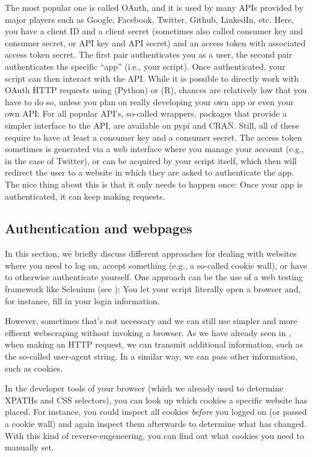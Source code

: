The most popular one is called OAuth, and it is used by many APIs
provided by major players such as Google, Facebook, Twitter, Github,
LinkedIn, etc. Here, you have a client ID and a client secret
(sometimes also called consumer key and consumer secret, or API key and API secret) and an
access token with associated access token secret. The first pair
authenticates you as a user, the second pair authenticates the
specific ``app'' (i.e., your script). Once authenticated, your
script can then interact with the API. While it is possible to
directly work with OAuth HTTP requests using 
(Python) or  (R), chances are relatively low that you
have to do so, unless you plan on really developing your own app
or even your own API: For all popular API's, so-called wrappers,
packages that provide a simpler interface to the API, are available
on pypi and CRAN. Still, all of these require to have at least
a consumer key and a consumer secret. The access token sometimes
is generated via a web interface where you manage your account
(e.g., in the case of Twitter), or can be acquired by your script
itself, which then will redirect the user to a website in which
they are asked to authenticate the app. The nice thing about this
is that it only needs to happen once: Once your app is authenticated,
it can keep making requests.




\subsection{Authentication and webpages}
\label{sec:authweb}
In this section, we briefly discuss different approaches for dealing
with websites where you need to log on, accept something (e.g., a
so-called cookie wall), or have to otherwise authenticate yourself.
One approach can be the use of a web testing framework like Selenium
(see ): You let your script literally open a browser
and, for instance, fill in your login information.

However, sometimes that's not necessary and we can still use simpler
and more efficent webscraping without invoking a browser. As we have already
seen in , when making an HTTP request, we can transmit
additional information, such as the so-called user-agent string. In a
similar way, we can pass other information, such as cookies.

In the developer tools of your browser (which we already used to determine
XPATHs and CSS selectors), you can look up which cookies a specific website
has placed. For instance, you could inspect all cookies \emph{before} you
logged on (or passed a cookie wall) and again inspect them afterwards to
determine what has changed. With this kind of reverse-engeneering, you
can find out what cookies you need to manually set.

